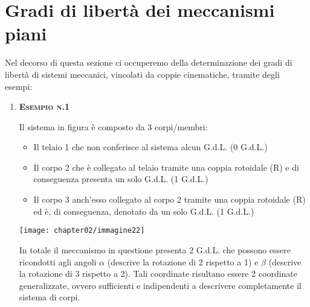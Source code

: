 \section{Gradi di libertà dei meccanismi piani}
	
	Nel decorso di questa sezione ci occuperemo della determinazione dei gradi di libertà di sistemi meccanici, vincolati da coppie cinematiche, tramite degli esempi:

	\begin{enumerate}
		\item {\scshape{\bfseries Esempio n.1}}

		\vspace{1mm}
		\begin{minipage}{.55\textwidth}
			Il sistema in figura è composto da 3 corpi/membri:
			\begin{itemize}
			\item Il telaio 1 che non conferisce al sistema alcun G.d.L. (0 G.d.L.)
			\item Il corpo 2 che è collegato al telaio tramite una coppia rotoidale (R) e di conseguenza presenta un solo G.d.L. (1 G.d.L.)
			\item Il corpo 3 anch'esso collegato al corpo 2 tramite una coppia rotoidale (R) ed è, di conseguenza, denotato da un solo G.d.L. (1 G.d.L.)
			\end{itemize}
			\end{minipage}
			\hfill
			\begin{minipage}{.45\textwidth}
			\centering
			\texttt{[image: chapter02/immagine22]}
			\end{minipage}
			
			In totale il meccanismo in questione presenta 2 G.d.L. che possono essere ricondotti agli angoli $\alpha$ (descrive la rotazione di 2 rispetto a 1) e $\beta$ (descrive la rotazione di 3 rispetto a 2).
			\newline
			Tali coordinate risultano essere 2 coordinate generalizzate, ovvero sufficienti e indipendenti a descrivere completamente il sistema di corpi.
		

\end{enumerate}
